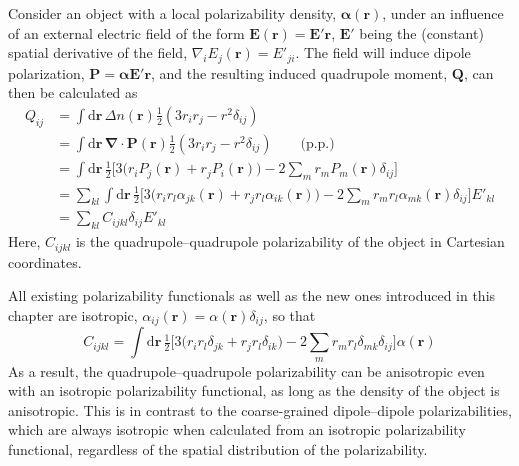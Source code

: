 Consider an object with a local polarizability density, $\boldsymbol\alpha(\mathbf r)$, under an influence of an external electric field of the form $\mathbf E(\mathbf r)=\mathbf E'\mathbf r$, $\mathbf E'$ being the (constant) spatial derivative of the field, $\nabla_i E_j(\mathbf r)=E'_{ji}$.
The field will induce dipole polarization, $\mathbf P=\boldsymbol\alpha\mathbf E'\mathbf r$, and the resulting induced quadrupole moment, $\mathbf Q$, can then be calculated as
\begin{equation}
\begin{aligned}
Q_{ij}&=\int\mathrm d\mathbf r\,\Delta n(\mathbf r)\tfrac12(3r_i r_j-r^2\delta_{ij}) \\
&=\int\mathrm d\mathbf r\,\boldsymbol\nabla\cdot\mathbf P(\mathbf r)\tfrac12(3r_i r_j-r^2\delta_{ij})\qquad\text{(p.p.)} \\
&=\int\mathrm d\mathbf r\,\tfrac12\big[3\big(r_i P_j(\mathbf r)+r_j P_i(\mathbf r)\!\big)-2{\textstyle\sum_m}r_m P_m(\mathbf r)\delta_{ij}] \\
&=\sum_{kl}\int\mathrm d\mathbf r\,\tfrac12\big[3\big(r_i r_l\alpha_{jk}(\mathbf r)+r_j r_l\alpha_{ik}(\mathbf r)\!\big)-2{\textstyle\sum_m}r_m r_l\alpha_{mk}(\mathbf r)\delta_{ij}]E'_{kl} \\
&=\sum_{kl}C_{ijkl}\delta_{ij}E'_{kl}
\end{aligned}
\end{equation}
Here, $C_{ijkl}$ is the quadrupole--quadrupole polarizability of the object in Cartesian coordinates.

All existing polarizability functionals as well as the new ones introduced in this chapter are isotropic, $\alpha_{ij}(\mathbf r)=\alpha(\mathbf r)\delta_{ij}$, so that
\begin{equation}
C_{ijkl}=\int\mathrm d\mathbf r\,\tfrac12\big[3\big(r_i r_l\delta_{jk}+r_j r_l\delta_{ik}\!\big)-2{\textstyle\sum_m}r_m r_l\delta_{mk}\delta_{ij}\big]\alpha(\mathbf r)
\end{equation}
As a result, the quadrupole--quadrupole polarizability can be anisotropic even with an isotropic polarizability functional, as long as the density of the object is anisotropic.
This is in contrast to the coarse-grained dipole--dipole polarizabilities, which are always isotropic when calculated from an isotropic polarizability functional, regardless of the spatial distribution of the polarizability.


